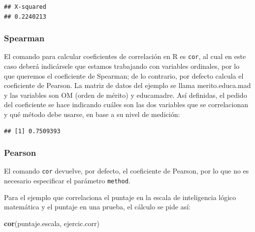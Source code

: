 \documentclass[]{book}
\newenvironment{Shaded}{\begin{snugshade}}{\end{snugshade}}
\newcommand{\DataTypeTok}[1]{\textcolor[rgb]{0.13,0.29,0.53}{#1}}
\newcommand{\KeywordTok}[1]{\textcolor[rgb]{0.13,0.29,0.53}{\textbf{#1}}}
\newcommand{\NormalTok}[1]{#1}
\newcommand{\OperatorTok}[1]{\textcolor[rgb]{0.81,0.36,0.00}{\textbf{#1}}}
\newcommand{\StringTok}[1]{\textcolor[rgb]{0.31,0.60,0.02}{#1}}
\begin{document}
\begin{verbatim}
## X-squared 
## 0.2240213
\end{verbatim}

\hypertarget{spearman}{%
\subsubsection{Spearman}\label{spearman}}

El comando para calcular coeficientes de correlación en R es \texttt{cor}, al cual en este caso deberá indicársele que estamos trabajando con variables ordinales, por lo que queremos el coeficiente de Spearman; de lo contrario, por defecto calcula el coeficiente de Pearson. La matriz de datos del ejemplo se llama merito.educa.mad y las variables son OM (orden de mérito) y educamadre. Así definidas, el pedido del coeficiente se hace indicando cuáles son las dos variables que se correlacionan y qué método debe usarse, en base a su nivel de medición:

\begin{Shaded}
\end{Shaded}

\begin{verbatim}
## [1] 0.7509393
\end{verbatim}

\hypertarget{pearson}{%
\subsubsection{Pearson}\label{pearson}}

El comando \texttt{cor} devuelve, por defecto, el coeficiente de Pearson, por lo que no es necesario especificar el parámetro \texttt{method}.

Para el ejemplo que correlaciona el puntaje en la escala de inteligencia lógico matemática y el puntaje en una prueba, el cálculo se pide así:

\begin{Shaded}
\begin{Highlighting}[]
\KeywordTok{cor}\NormalTok{(puntaje.escala, ejercic.corr)}
\end{Highlighting}
\end{Shaded}
\end{document}
